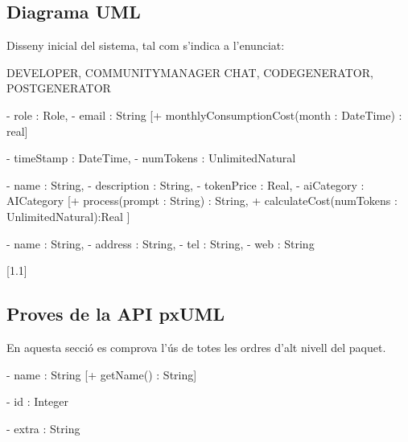 \documentclass[fake,cover-config=offset,default]{P3CTeX}
\begin{document}
	\subsection{Diagrama UML}
	Disseny inicial del sistema, tal com s'indica a l'enunciat:

	{
		DEVELOPER,
		COMMUNITYMANAGER
	}
	{
		CHAT,
		CODEGENERATOR,
		POSTGENERATOR
	}

	{
		- role : Role,
		- email : String
	}[+ monthlyConsumptionCost(month : DateTime) : real]

	{
		- timeStamp : DateTime,
		- numTokens : UnlimitedNatural
	}

	{
		- name : String,
		- description : String,
		- tokenPrice : Real,
		- aiCategory : AICategory
	}[+ process(prompt : String) : String, + calculateCost(numTokens : UnlimitedNatural):Real	]

	{
		- name : String,
		- address : String,
		- tel : String,
		- web : String
	}

	[1.1\linewidth]
	\subsection{Proves de la API pxUML}

	En aquesta secció es comprova l'ús de totes les ordres d'alt nivell del paquet.

	{
		- name : String
	}
	[+ getName() : String]


	{
		- id : Integer
	}

	{
		- extra : String
	}

\end{document}
